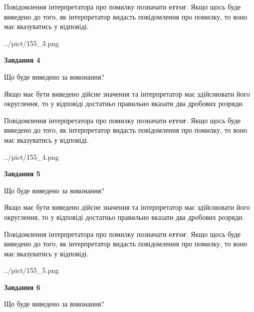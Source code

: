 \documentclass[12pt, ukrainian]{article}
\begin{document}
{\begin {Large}
Повідомлення інтерпретатора про помилку позначати \textbf{error}.
Якщо щось буде виведено до того, як інтерпретатор видасть повідомлення про помилку, 
то воно має вказуватись у відповіді. \par

\begin{center}
	{../pict/155_3.png}
\end{center}
\newpage

{\begin {center}\textbf{Завдання 4}\end {center}}\par
Що буде виведено за виконання? \par

Якщо має бути виведено дійсне значення та інтерпретатор має здійснювати його округлення, 
то у відповіді достатньо правильно вказати два дробових розряди.

Повідомлення інтерпретатора про помилку позначати \textbf{error}.
Якщо щось буде виведено до того, як інтерпретатор видасть повідомлення про помилку, 
то воно має вказуватись у відповіді. \par

\begin{center}
	{../pict/155_4.png}
\end{center}
\newpage

{\begin {center}\textbf{Завдання 5}\end {center}}\par
Що буде виведено за виконання? \par

Якщо має бути виведено дійсне значення та інтерпретатор має здійснювати його округлення, 
то у відповіді достатньо правильно вказати два дробових розряди.

Повідомлення інтерпретатора про помилку позначати \textbf{error}.
Якщо щось буде виведено до того, як інтерпретатор видасть повідомлення про помилку, 
то воно має вказуватись у відповіді. \par

\begin{center}
	{../pict/155_5.png}
\end{center}
\newpage

{\begin {center}\textbf{Завдання 6}\end {center}}\par
Що буде виведено за виконання? \par


\end{Large}}
\end{document}
